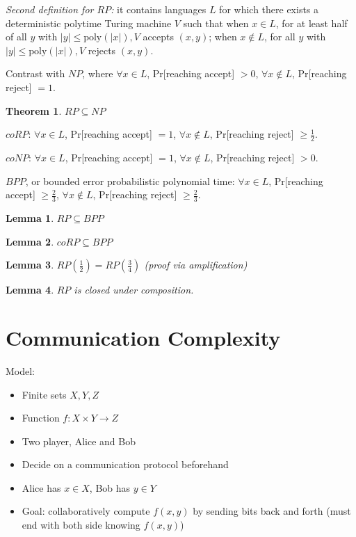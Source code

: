 \documentclass[letterpaper,landscape,11pt]{article}
\newtheorem{theorem}{Theorem}
\newtheorem{lemma}{Lemma}
\begin{document}
\emph{Second definition for $RP$:} it contains languages $L$ for which there exists a deterministic polytime Turing machine $V$ such that when $x \in L$, for at least half of all $y$ with $|y| \leq \text{poly}(|x|), V$ accepts $(x, y)$; when $x \notin L$, for all $y$ with $|y| \leq \text{poly}(|x|), V$ rejects $(x, y)$.

Contrast with $NP$, where $\forall x \in L$, Pr[reaching accept] $ > 0$, $\forall x \notin L$, Pr[reaching reject] $ = 1$.

\begin{theorem}
	$RP \subseteq NP$
\end{theorem}

$coRP$: $\forall x \in L$, Pr[reaching accept] $ = 1$, $\forall x \notin L$, Pr[reaching reject] $\geq \frac{1}{2}$.

$coNP$: $\forall x \in L$, Pr[reaching accept] $ = 1$, $\forall x \notin L$, Pr[reaching reject] $> 0$.

$BPP$, or bounded error probabilistic polynomial time: $\forall x \in L$, Pr[reaching accept] $\geq \frac{2}{3}$, $\forall x \notin L$, Pr[reaching reject] $\geq \frac{2}{3}$.

\begin{lemma}
	$RP \subseteq BPP$
\end{lemma}

\begin{lemma}
	$coRP \subseteq BPP$
\end{lemma}

\begin{lemma}
	$RP(\frac{1}{2}) = RP(\frac{3}{4})$ (proof via amplification)
\end{lemma}

\begin{lemma}
	$RP$ is closed under composition.
\end{lemma}

\section{Communication Complexity}
Model:
\begin{itemize}
	\item Finite sets $X, Y, Z$
	\item Function $f : X \times Y \rightarrow Z$
	\item Two player, Alice and Bob
	\item Decide on a communication protocol beforehand
	\item Alice has $x \in X$, Bob has $y \in Y$
	\item Goal: collaboratively compute $f(x, y)$ by sending bits back and forth (must end with both side knowing $f(x, y)$)
\end{itemize}
\end{document}
